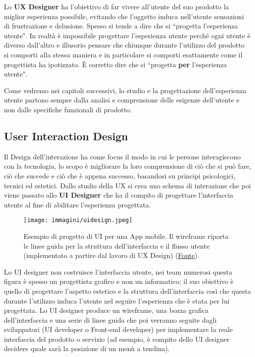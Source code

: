 
Lo \textbf{UX Designer} ha l'obiettivo di far vivere all'utente del suo prodotto la miglior esperienza possibile, evitando che l'oggetto
induca nell'utente sensazioni di frustrazione e delusione. Spesso si tende a dire che si ``progetta l'esperienza utente". In realtà è impossibile
progettare l'esperienza utente perché ogni utente è diverso dall'altro e illusorio pensare che chiunque durante l'utilizzo del prodotto si
comporti alla stessa maniera e in particolare si comporti esattamente come il progettista ha ipotizzato. \`E corretto dire che si
``progetta \textbf{per} l'esperienza utente".

Come vedremo nei capitoli successivi, lo studio e la progettazione dell'esperienza utente partono sempre dalla analisi e comprensione delle esigenze
dell'utente e non dalle specifiche funzionali di prodotto. 

\subsection{User Interaction Design}
Il Design dell'interazione ha come focus il modo in cui le persone interagiscono con la tecnologia, lo scopo è migliorare la loro comprensione di ciò
che si può fare, ciò che succede e ciò che è appena successo, basandosi su principi psicologici, tecnici ed estetici. Dallo studio della UX si crea
uno schema di interazione che poi viene passato allo \textbf{UI Designer} che ha il compito di progettare l'interfaccia utente al fine di abilitare
l'esperienza progettata.

\begin{figure}[!ht]
	\centering
	\texttt{[image: immagini/uidesign.jpeg]}
	\caption{Esempio di progetto di UI per una App mobile. Il wireframe riporta le linee guida per la struttura dell'interfaccia e il flusso utente
	(implementato a partire dal lavoro di UX Design) (\href{https://blog.prototypr.io/why-you-shouldnt-skip-your-wireframing-1f7a70d5c125}{Fonte}).}
\end{figure}

Lo UI designer non costruisce l'interfaccia utente, nei team numerosi questa figura è spesso un progettista grafico e non un informatico;
il suo obiettivo è quello di progettare l'aspetto estetico e la struttura dell'interfaccia così che questa durante l'utilizzo induca
l'utente nel seguire l'esperienza che è stata per lui progettata. Lo UI designer produce un wireframe, una bozza grafica dell'interfaccia e una
serie di linee guida che poi verranno seguite dagli sviluppatori (UI developer o Front-end developer) per implementare la reale interfaccia del prodotto
o servizio (ad esempio, è compito dello UI designer decidere quale sarà la posizione di un menù a tendina).

